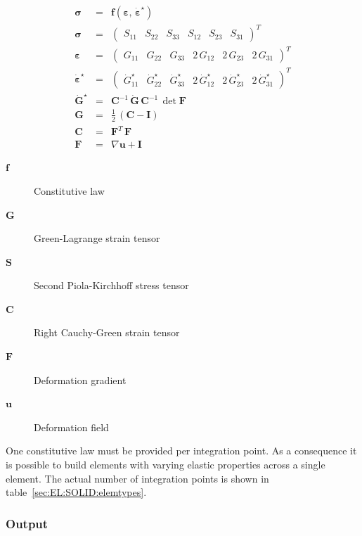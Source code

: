 \begin{eqnarray}
  \label{sec:EL:SOLID:constlaw}
  \boldsymbol{\sigma} & = & \boldsymbol{f}\left(\boldsymbol{\varepsilon},\, \dot{\boldsymbol{\varepsilon}}^{\star}\right) \\
  \boldsymbol{\sigma} & = & \begin{pmatrix} S_{11} & S_{22} & S_{33} & S_{12} & S_{23} & S_{31} \end{pmatrix}^T \\
  \boldsymbol{\varepsilon} & = & \begin{pmatrix} G_{11} & G_{22} & G_{33} & 2\,G_{12} & 2\,G_{23} & 2\,G_{31} \end{pmatrix}^T \\
  \dot{\boldsymbol{\varepsilon}}^{\star} & = & \begin{pmatrix} \dot{G}_{11}^{\star} & \dot{G}_{22}^{\star} & \dot{G}_{33}^{\star} & 2\,\dot{G}_{12}^{\star} & 2\,\dot{G}_{23}^{\star} & 2\,\dot{G}_{31}^{\star} \end{pmatrix}^T \\
  \dot{\boldsymbol{G}}^{\star} & = & \boldsymbol{C}^{-1} \, \dot{\boldsymbol{G}} \, \boldsymbol{C}^{-1} \, \det{\boldsymbol{F}} \\
  \boldsymbol{G} & = & \frac{1}{2}\,\left(\boldsymbol{C} - \boldsymbol{I}\right) \\
  \boldsymbol{C} & = & \boldsymbol{F}^T\,\boldsymbol{F} \\
  \boldsymbol{F} & = & \nabla \boldsymbol{u} + \boldsymbol{I}
\end{eqnarray}
\begin{description}
\item[$\boldsymbol{f}$] Constitutive law
\item[$\boldsymbol{G}$] Green-Lagrange strain tensor
\item[$\boldsymbol{S}$] Second Piola-Kirchhoff stress tensor
\item[$\boldsymbol{C}$] Right Cauchy-Green strain tensor
\item[$\boldsymbol{F}$] Deformation gradient
\item[$\boldsymbol{u}$] Deformation field
\end{description}
One constitutive law must be provided per integration point.
As a consequence it is possible to build elements with varying elastic properties across a single element.
The actual number of integration points is shown in table~\ref{sec:EL:SOLID:elemtypes}.
\subsubsection{Output}
